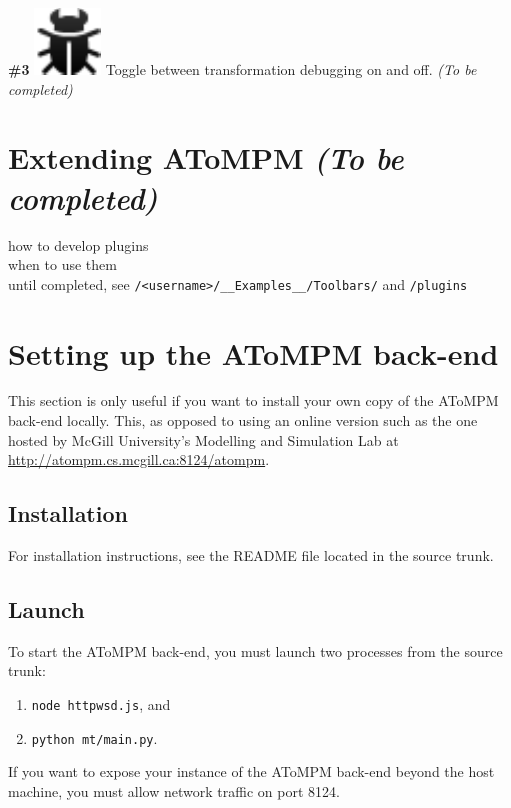 \documentclass{article}
\numberwithin{equation}{section}
\numberwithin{figure}{section}
\newcommand{\TBC}{\textit{(To be completed) }}
\begin{document}
\textbf{\#3} \hspace*{1cm}
\includegraphics[scale=0.5]{figures/icon_toggledebug} \hspace*{1cm}
Toggle between transformation debugging on and off. \TBC




\newpage
\section{Extending AToMPM \TBC}
how to develop plugins\\
when to use them\\

until completed, see \texttt{/<username>/\_\_Examples\_\_/Toolbars/} and \texttt{/plugins}





\newpage
\appendix
\section{Setting up the AToMPM back-end}
This section is only useful if you want to install your own copy of the AToMPM back-end locally. This, as opposed to using an online version such as the one hosted by McGill University's Modelling and Simulation Lab at \url{http://atompm.cs.mcgill.ca:8124/atompm}.


\subsection{Installation}
For installation instructions, see the README file located in the source trunk.


\subsection{Launch}
To start the AToMPM back-end, you must launch two processes from the source trunk:
\begin{enumerate}
	\item \texttt{node httpwsd.js}, and
	\item \texttt{python mt/main.py}.\\
\end{enumerate}

If you want to expose your instance of the AToMPM back-end beyond the host machine, you must allow network traffic on port 8124.
\end{document}
